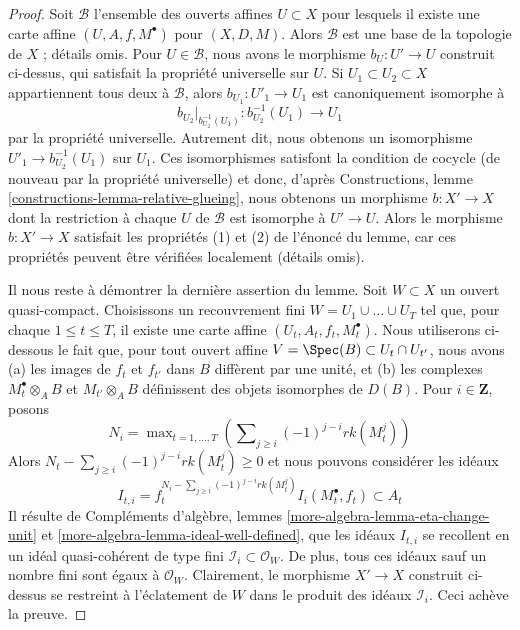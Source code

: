 \begin{proof}
\medskip\noindent
Soit $\mathcal{B}$ l'ensemble des ouverts affines $U \subset X$
pour lesquels il existe une carte affine $(U, A, f, M^\bullet)$
pour $(X, D, M)$. Alors $\mathcal{B}$ est une base de la topologie
de $X$ ; détails omis. Pour $U \in \mathcal{B}$, nous avons
le morphisme $b_U : U' \to U$ construit ci-dessus, qui satisfait
la propriété universelle sur $U$. Si $U_1 \subset U_2 \subset X$
appartiennent tous deux à $\mathcal{B}$, alors $b_{U_1} : U'_1 \to U_1$
est canoniquement isomorphe à
$$
b_{U_2}|_{b_{U_2}^{-1}(U_1)} : b_{U_2}^{-1}(U_1) \longrightarrow U_1
$$
par la propriété universelle. Autrement dit, nous obtenons un isomorphisme
$U'_1 \to b_{U_2}^{-1}(U_1)$ sur $U_1$. Ces isomorphismes satisfont
la condition de cocycle (de nouveau par la propriété universelle) et donc, d'après
Constructions, lemme \ref{constructions-lemma-relative-glueing},
nous obtenons un morphisme $b : X' \to X$ dont la restriction à chaque
$U$ de $\mathcal{B}$ est isomorphe à $U' \to U$.
Alors le morphisme $b : X' \to X$ satisfait les propriétés (1) et (2)
de l'énoncé du lemme, car ces propriétés peuvent être vérifiées
localement (détails omis).

\medskip\noindent
Il nous reste à démontrer la dernière assertion du lemme.
Soit $W \subset X$ un ouvert quasi-compact.
Choisissons un recouvrement fini $W = U_1 \cup \ldots \cup U_T$
tel que, pour chaque $1 \leq t \leq T$, il existe une carte affine
$(U_t, A_t, f_t, M_t^\bullet)$. Nous utiliserons ci-dessous le fait que, pour tout
ouvert affine $V = \Spec(B) \subset U_t \cap U_{t'}$, nous avons
(a) les images de $f_t$ et $f_{t'}$ dans $B$ diffèrent par une unité, et
(b) les complexes $M_t^\bullet \otimes_A B$ et $M_{t'} \otimes_A B$
définissent des objets isomorphes de $D(B)$. Pour $i \in \mathbf{Z}$, posons
$$
N_i = \max\nolimits_{t = 1, \ldots, T}
\left(\sum\nolimits_{j \geq i} (-1)^{j - i} rk(M_t^j)\right)
$$
Alors $N_t - \sum\nolimits_{j \geq i} (-1)^{j - i} rk(M_t^j) \geq 0$
et nous pouvons considérer les idéaux
$$
I_{t, i} =
f_t^{N_i - \sum\nolimits_{j \geq i} (-1)^{j - i} rk(M_t^j)}
I_i(M_t^\bullet, f_t)
\subset A_t
$$
Il résulte de Compléments d'algèbre, lemmes
\ref{more-algebra-lemma-eta-change-unit} et
\ref{more-algebra-lemma-ideal-well-defined},
que les idéaux $I_{t, i}$ se recollent en un idéal quasi-cohérent de type fini
$\mathcal{I}_i \subset \mathcal{O}_W$. De plus, tous ces idéaux sauf
un nombre fini sont égaux à $\mathcal{O}_W$.
Clairement, le morphisme $X' \to X$ construit ci-dessus
se restreint à l'éclatement de $W$ dans le produit
des idéaux $\mathcal{I}_i$. Ceci achève la preuve.
\end{proof}

